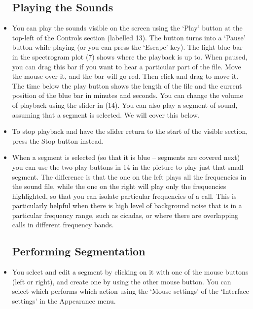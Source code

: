 \documentclass{article}
\begin{document}
\begin{itemize}
\subsection{Playing the Sounds \label{sec:play}}

\item You can play the sounds visible on the screen using the `Play' button at the top-left of the Controls section (labelled 13). The button turns into a `Pause' button while playing (or you can press the `Escape' key). The light blue bar in the spectrogram plot (7)  shows where the playback is up to. When paused, you can drag this bar if you want to hear a particular part of the file. Move the mouse over it, and the bar will go red. Then click and drag to move it. The time below the play button shows the length of the file and the current position of the blue bar in minutes and seconds. You can change the volume of playback using the slider in (14). 
You can also play a segment of sound, assuming that a segment is selected. We will cover this below.

\item To stop playback and have the slider return to the start of the visible section, press the Stop button instead.

\item When a segment is selected (so that it is blue -- segments are covered next) you can use the two play buttons in 14 in the picture to play just that small segment. The difference is that the one on the left plays all the frequencies in the sound file, while the one on the right will play only the frequencies highlighted, so that you can isolate particular frequencies of a call. This is particularly helpful when there is high level of background noise that is in a particular frequency range, such as cicadas, or where there are overlapping calls in different frequency bands.

\subsection{Performing Segmentation}

\item You select and edit a segment by clicking on it with one of the mouse buttons (left or right), and create one by using the other mouse button. You can select which performs which action using the `Mouse settings' of the `Interface settings' in the Appearance menu. 


\end{itemize}
\end{document}
